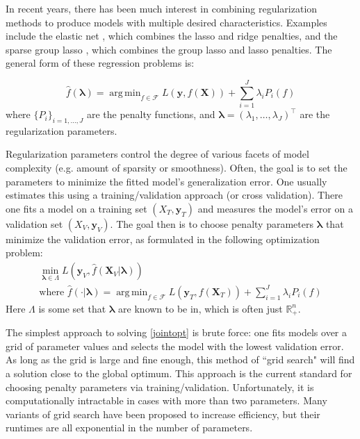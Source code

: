 \documentclass[10pt,letterpaper]{article}
\DeclareMathOperator*{\argmin}{arg\,min}
\begin{document}
In recent years, there has been much interest in combining regularization methods to produce models with multiple desired characteristics. Examples include the elastic net \citep{zou2003regression}, which combines the lasso and ridge penalties, and the sparse group lasso \citep{simon2013sparse}, which combines the group lasso and lasso penalties. The general form of these regression problems is:

\begin{equation} \label {eq:basic}
\hat f(\boldsymbol{\lambda}) = \argmin_{f\in\mathcal{F}} L\left (\boldsymbol{y}, f (\boldsymbol{X}) \right ) + \sum\limits_{i=1}^J \lambda_i P_i(f)
\end{equation}
where $\{P_i\}_{i=1, ..., J}$ are the penalty functions, and $\boldsymbol{\lambda} = (\lambda_1, \ldots, \lambda_J)^\top$ are the regularization parameters.

Regularization parameters control the degree of various facets of model complexity (e.g. amount of sparsity or smoothness). Often, the goal is to set the parameters to minimize the fitted model's generalization error. One usually estimates this using a training/validation approach (or cross validation). There one fits a model on a training set $(X_T, \boldsymbol y_T)$ and measures the model's error on a validation set $(X_V, \boldsymbol y_V)$. The goal then is to choose penalty parameters $\boldsymbol{\lambda}$ that minimize the validation error, as formulated in the following optimization problem:
\begin{equation}
\begin{array}{c}
\min_{\boldsymbol{\lambda} \in \Lambda} L\left (\boldsymbol{y}_V, \hat f (\boldsymbol{X}_V | \boldsymbol{\lambda}) \right) \\
\text{where } \hat f(\cdot | \boldsymbol{\lambda}) = \argmin_{f\in\mathcal{F}} L \left (\boldsymbol{y}_T, f (\boldsymbol{X}_T) \right) + \sum\limits_{i=1}^J \lambda_i P_i(f)
\end{array}
\label{jointopt}
\end{equation}
Here $\Lambda$ is some set that $\boldsymbol{\lambda}$ are known to be in, which is often just $\mathbb{R}^{n}_+$.

The simplest approach to solving \eqref{jointopt} is brute force: one fits models over a grid of parameter values and selects the model with the lowest validation error. As long as the grid is large and fine enough, this method of ``grid search" will find a solution close to the global optimum. This approach is the current standard for choosing penalty parameters via training/validation. Unfortunately, it is computationally intractable in cases with more than two parameters. Many variants of grid search have been proposed to increase efficiency, but their runtimes are all exponential in the number of parameters.
\end{document}
